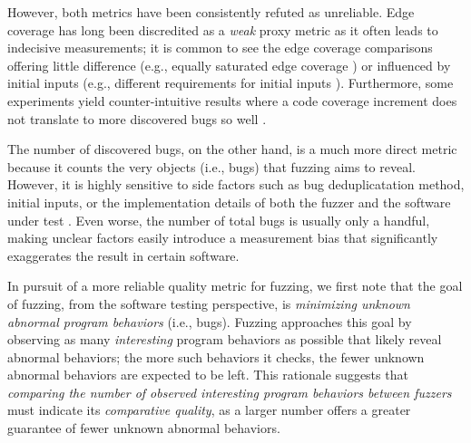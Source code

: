\documentclass[letterpaper,twocolumn,10pt]{article}
\begin{document}
However, both metrics have been consistently refuted as unreliable. Edge
coverage has long been discredited as a \emph{weak} proxy metric as it
often leads to indecisive measurements; it is common to see the edge coverage
comparisons offering little difference (e.g., equally saturated edge coverage 
\cite{myung2022mundofuzz,sergej2021nyx}) or
influenced by initial inputs (e.g., different requirements for initial inputs 
\cite{chen2021polyglot}).
Furthermore, some experiments yield counter-intuitive results where a code
coverage increment does not translate to more discovered bugs so well
\cite{google-ai}.

The number of discovered bugs, on the other hand, is a much more direct metric
because it counts the very objects (i.e., bugs) that fuzzing aims to reveal.
However, it is highly sensitive to side factors such as bug deduplicatation
method, initial inputs, or the implementation details of both the fuzzer and the
software under test \cite{klees2018evaluating}. Even worse, the number of total
bugs is usually only a handful,
making unclear factors easily introduce a measurement bias that significantly
exaggerates the result in certain software.

In pursuit of a more reliable quality metric for fuzzing, we first note that the
goal of fuzzing, from the software testing perspective, is \emph{minimizing
unknown abnormal program behaviors} (i.e., bugs). Fuzzing approaches this goal
by observing as many \emph{interesting} program behaviors as possible that 
likely reveal abnormal behaviors; the more such behaviors it checks, the fewer
unknown abnormal behaviors are expected to be left.
%
This rationale suggests that \emph{comparing the number of observed interesting
program behaviors between fuzzers} must indicate its \emph{comparative
quality}, as a larger number offers a greater guarantee of fewer unknown
abnormal behaviors. 
\end{document}
